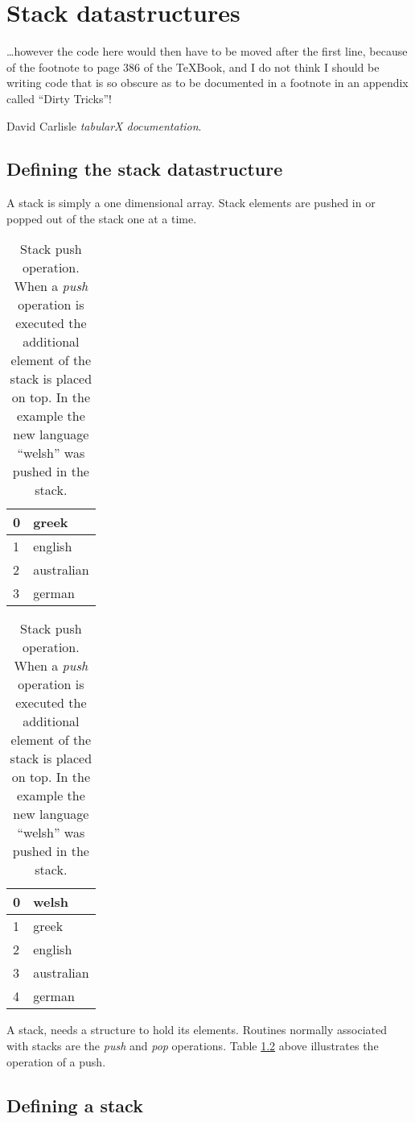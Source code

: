 \documentclass{book}
\begin{document}
\chapter{Stack datastructures}
\hfill\hfill\parbox{9cm}{\vspace{-30pt}
\small \dots however the code here would then have to be moved after the first line, because of the footnote to page 386 of the \TeX Book, and I do not think I should be writing code that is so obscure as to be documented in a footnote in an appendix called ``Dirty Tricks''!

\hfill\hfill David Carlisle \textit{tabularX documentation}.
}

\makeatletter
\section{Defining the stack datastructure}
\parindent0pt
A stack is simply a one dimensional array. Stack elements are pushed in or popped out of the stack one at a time.

\begin{table}[htbp]
\begin{center}
\begin{tabular}[t]{|l|l|}
\hline
0&greek\\\hline
1&english\\\hline
2&australian\\\hline
3&german\\
\hline
\end{tabular}
\begin{tabular}[t]{|l|l|}
\hline
0&welsh\\\hline
1&greek\\\hline
2&english\\\hline
3&australian\\\hline
4&german\\
\hline
\end{tabular}
\caption{\small Stack push operation. When a \textit{push} operation is executed the additional element of the stack is placed on top. In the example the new language ``welsh'' was pushed in the stack.}
\label{tbl:stack}
\end{center}
\end{table}

A stack, needs a structure to hold its elements. Routines normally associated with stacks are the \textit{push} and \textit{pop} operations.
Table \ref{tbl:stack} above illustrates the operation of a push.
\section{Defining a stack}
  
\end{document}
